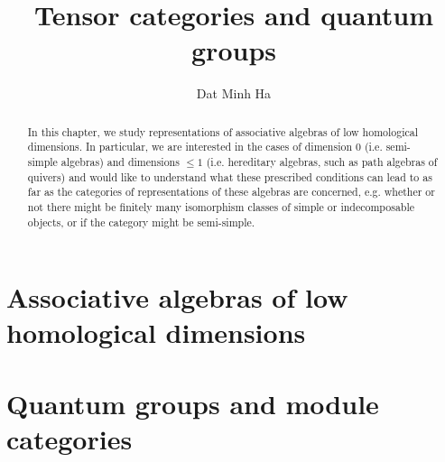 

\setcounter{chapter}{-1}
\setcounter{section}{-1}





	\title{Tensor categories and quantum groups}
	
	\author{Dat Minh Ha}
	\maketitle
	
	\begin{abstract}
	    
	\end{abstract}
	
	{
      \hypersetup{} 
      \dominitoc
      \tableofcontents %
    }
    
    
    
    \chapter{Associative algebras of low homological dimensions}
        \begin{abstract}
            In this chapter, we study representations of associative algebras of low homological dimensions. In particular, we are interested in the cases of dimension $0$ (i.e. semi-simple algebras) and dimensions $\leq 1$ (i.e. hereditary algebras, such as path algebras of quivers) and would like to understand what these prescribed conditions can lead to as far as the categories of representations of these algebras are concerned, e.g. whether or not there might be finitely many isomorphism classes of simple or indecomposable objects, or if the category might be semi-simple. 
        \end{abstract}
        
        \minitoc
        
        
        
        
        
        
        
        
    
    \chapter{Quantum groups and module categories}
        \begin{abstract}
            
        \end{abstract}
        

